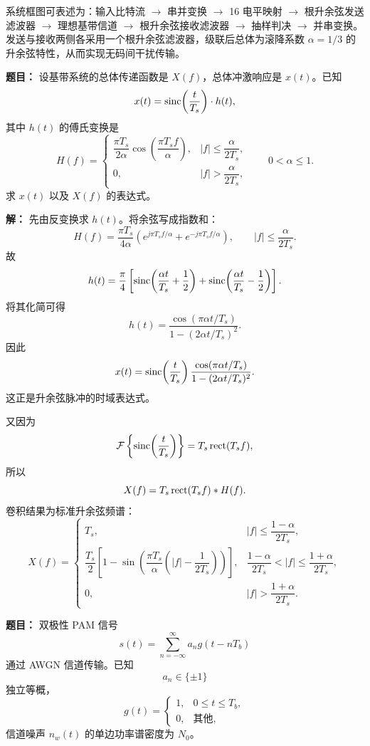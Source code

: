 系统框图可表述为：输入比特流 $\to$ 串并变换 $\to$ 16 电平映射 $\to$ 根升余弦发送滤波器 $\to$ 理想基带信道 $\to$ 根升余弦接收滤波器 $\to$ 抽样判决 $\to$ 并串变换。
发送与接收两侧各采用一个根升余弦滤波器，级联后总体为滚降系数 $\alpha=1/3$ 的升余弦特性，从而实现无码间干扰传输。

\medskip
{}
\textbf{题目：}
设基带系统的总体传递函数是 $X(f)$，总体冲激响应是 $x(t)$。已知
\[
x(t)=\operatorname{sinc}\!\left(\frac{t}{T_s}\right)\cdot h(t),
\]
其中 $h(t)$ 的傅氏变换是
\[
H(f)=
\begin{cases}
\dfrac{\pi T_s}{2\alpha}\cos\!\left(\dfrac{\pi T_s f}{\alpha}\right),
& |f|\le \dfrac{\alpha}{2T_s},\\[10pt]
0,& |f|>\dfrac{\alpha}{2T_s},
\end{cases}
\qquad 0<\alpha\le 1.
\]
求 $x(t)$ 以及 $X(f)$ 的表达式。

\par\textbf{解：}
先由反变换求 $h(t)$。将余弦写成指数和：
\[
H(f)=\frac{\pi T_s}{4\alpha}
\left(
e^{j\pi T_sf/\alpha}+e^{-j\pi T_sf/\alpha}
\right),
\qquad |f|\le \frac{\alpha}{2T_s}.
\]
故
\[
h(t)=\frac{\pi}{4}\left[
\operatorname{sinc}\!\left(\frac{\alpha t}{T_s}+\frac12\right)
+\operatorname{sinc}\!\left(\frac{\alpha t}{T_s}-\frac12\right)
\right].
\]
将其化简可得
\[
h(t)=\frac{\cos(\pi\alpha t/T_s)}{1-(2\alpha t/T_s)^2}.
\]
因此
\[
x(t)=\operatorname{sinc}\!\left(\frac{t}{T_s}\right)\frac{\cos(\pi\alpha t/T_s)}{1-(2\alpha t/T_s)^2}.
\]
这正是升余弦脉冲的时域表达式。

又因为
\[
\mathcal{F}\left\{\operatorname{sinc}\!\left(\frac{t}{T_s}\right)\right\}=T_s\operatorname{rect}(T_sf),
\]
所以
\[
X(f)=T_s\operatorname{rect}(T_sf)*H(f).
\]
卷积结果为标准升余弦频谱：
\[
X(f)=
\begin{cases}
T_s, & |f|\le \dfrac{1-\alpha}{2T_s},\\[8pt]
\dfrac{T_s}{2}\left[
1-\sin\!\left(\dfrac{\pi T_s}{\alpha}\left(|f|-\dfrac{1}{2T_s}\right)\right)
\right], &
\dfrac{1-\alpha}{2T_s}<|f|\le \dfrac{1+\alpha}{2T_s},\\[12pt]
0, & |f|>\dfrac{1+\alpha}{2T_s}.
\end{cases}
\]

\medskip
{}
\textbf{题目：}
双极性 PAM 信号
\[
s(t)=\sum_{n=-\infty}^{\infty}a_ng(t-nT_b)
\]
通过 AWGN 信道传输。已知
\[
a_n\in\{\pm1\}
\]
独立等概，
\[
g(t)=
\begin{cases}
1,&0\le t\le T_b,\\
0,&\text{其他},
\end{cases}
\]
信道噪声 $n_w(t)$ 的单边功率谱密度为 $N_0$。

